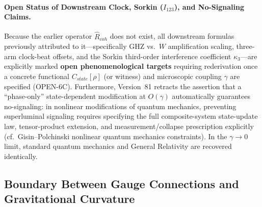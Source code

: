 \documentclass[american,11pt,letterpaper]{article}
\def\mathcal#1{#1}%
\def\mathrm#1{#1}%
\def\texttt#1{#1}%
\begin{document}
\paragraph{Open Status of Downstream Clock, Sorkin ($I_{123}$), and No-Signaling Claims.}
Because the earlier operator $\hat{\mathcal{R}}_{\mathrm{coh}}$ does not exist, all downstream formulas previously attributed to it---specifically GHZ vs.\ $W$ amplification scaling, three-arm clock-beat offsets, and the Sorkin third-order interference coefficient $\kappa_3$---are explicitly marked \textbf{open phenomenological targets} requiring rederivation once a concrete functional $\mathcal{C}_{\mathrm{state}}[\rho]$ (or witness) and microscopic coupling $\gamma$ are specified (\texttt{OPEN-6C}). Furthermore, Version~81 retracts the assertion that a ``phase-only'' state-dependent modification at $\mathcal{O}(\gamma)$ automatically guarantees no-signaling: in nonlinear modifications of quantum mechanics, preventing superluminal signaling requires specifying the full composite-system state-update law, tensor-product extension, and measurement/collapse prescription explicitly (cf.\ Gisin--Polchinski nonlinear quantum mechanics constraints). In the $\gamma \to 0$ limit, standard quantum mechanics and General Relativity are recovered identically.

\bigskip

\subsection{Boundary Between Gauge Connections and Gravitational Curvature}
\label{sec:dual_geometry}
\end{document}
